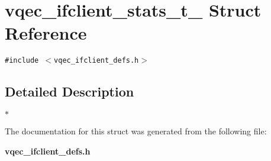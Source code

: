 \section{vqec\_\-ifclient\_\-stats\_\-t\_\- Struct Reference}
\label{structvqec__ifclient__stats__t__}
{\tt \#include $<$vqec\_\-ifclient\_\-defs.h$>$}



\subsection{Detailed Description}
$\ast$ 



The documentation for this struct was generated from the following file:\begin{CompactItemize}
\item 
\bf{vqec\_\-ifclient\_\-defs.h}\end{CompactItemize}
